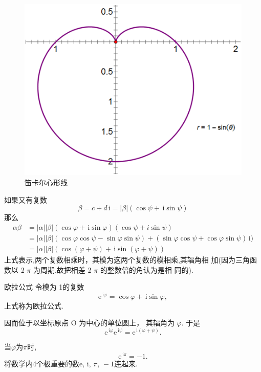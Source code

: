 \documentclass[13pt,punct]{ctexbeamer}
\def\e{\mathrm{e}}
\def\i{\, \mathrm{i}}
\begin{document}
\begin{frame}
	\begin{center}
		\begin{figure}[t]
			\includegraphics[scale=0.4]{r=1-sintheta.png}
			\caption{笛卡尔心形线~~~~~~}
		\end{figure}

	\end{center}


\end{frame}


\begin{frame}
	如果又有复数
	\[
	\beta=c+d {\i}=|\beta|(\cos \psi+\i \operatorname{sin} \psi)
	\]
	那么
	\[
	\begin{aligned}
		\alpha \beta &=|\alpha||\beta|(\cos \varphi+\i \operatorname{sin} \varphi)(\cos \psi+ i \operatorname{sin} \psi) \\
		&=|\alpha||\beta|(\cos \varphi \cos \psi-\sin \varphi \sin \psi)+(\sin \varphi \cos \psi+\cos \varphi \sin \psi) {\i}) \\
		&=|\alpha||\beta|(\cos (\varphi+\psi)+ \i \operatorname{sin}(\varphi+\psi))
	\end{aligned}
	\]
	上式表示,两个复数相乘时，其模为这两个复数的模相乘,其辐角相 加(因为三角函数以 2 $\pi$ 为周期,故把相差 2 $\pi$ 的整数倍的角认为是相 同的).
\end{frame}

\begin{frame}{欧拉公式}
	令模为 1的复数
	\[
	{\e}^{{\i} \varphi}=\cos \varphi+{\i} \sin \varphi,
	\]
	上式称为\alert{欧拉公式}.

	因而位于以坐标原点 O 为中心的单位圆上， 其辐角为 $\varphi$. 于是
	\[
	{\e}^{\i \varphi} {\e}^{{\i} \psi}={\e}^{{\i}(\varphi+\psi)}.
	\]


	当$\varphi$为$\pi$时, $${\e^{\i\pi }=-1}.$$
	将数学内4个极重要的数$\e, \i, \, \pi,\,  -1 $连起来.
\end{frame}
\end{document}
